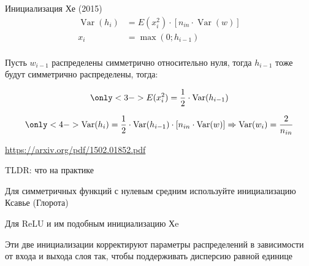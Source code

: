 \documentclass[notes,12pt, aspectratio=169]{beamer}
\newenvironment{wideitemize}{\itemize\addtolength{\itemsep}{10pt}}{\enditemize}
\DeclareMathOperator{\Var}{Var}
\begin{document}
\begin{frame}{Инициализация Хе (2015)}
	\begin{align*} 	
		\Var(h_i)  & =   E(x_i^2)  \cdot [n_{in} \cdot \Var(w)] \\
	x_i & = \max(0; h_{i-1}) \\ 
	\end{align*} \pause 

	 { Пусть $w_{i-1}$ распределены симметрично относительно нуля, тогда $h_{i-1}$ тоже будут симметрично распределены, тогда: }

	$$
	\only<3->{ E(x_i^2) = \frac{1}{2} \cdot \Var(h_{i-1}) }
	$$

	$$
	\only<4->{ \Var(h_i) =  \frac{1}{2} \cdot \Var(h_{i-1}) \cdot [n_{in} \cdot \Var(w)]  \Rightarrow \Var(w_i) = \frac{2}{n_{in}} }
	$$

	\vfill %
	\footnotesize
	{\color{blue} \url{https://arxiv.org/pdf/1502.01852.pdf}}
\end{frame}


\begin{frame}{TLDR: что на практике}
	\begin{wideitemize}
		\item  Для симметричных функций с нулевым средним используйте инициализацию Ксавье (Глорота) %
		\item  Для ReLU и им подобным инициализацию Хe %
		\item  Эти две инициализации корректируют параметры распределений в зависимости от входа и выхода слоя так, чтобы поддерживать дисперсию равной единице
	\end{wideitemize}
\end{frame}
\end{document}
